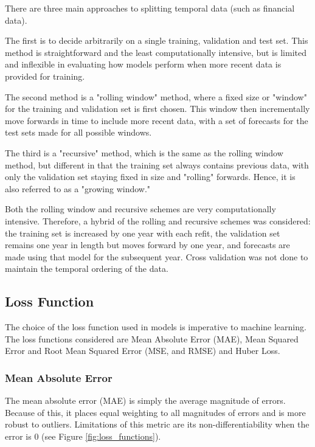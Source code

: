 \documentclass[a4paper]{article}
\begin{document}
	There are three main approaches to splitting temporal data (such as financial data). 
	
	The first is to decide arbitrarily on a single training, validation and test set. This method is straightforward and the least computationally intensive, but is limited and inflexible in evaluating how models perform when more recent data is provided for training. 
	
	The second method is a "rolling window" method, where a fixed size or "window" for the training and validation set is first chosen. This window then incrementally move forwards in time to include more recent data, with a set of forecasts for the test sets made for all possible windows.
	
	The third is a "recursive" method, which is the same as the rolling window method, but different in that the training set always contains previous data, with only the validation set staying fixed in size and "rolling" forwards. Hence, it is also referred to as a "growing window."
	
	Both the rolling window and recursive schemes are very computationally intensive. Therefore, a hybrid of the rolling and recursive schemes was considered: the training set is increased by one year with each refit, the validation set remains one year in length but moves forward by one year, and forecasts are made using that model for the subsequent year. Cross validation was not done to maintain the temporal ordering of the data.
	
	\subsection{Loss Function}
	
	The choice of the loss function used in models is imperative to machine learning. The loss functions considered are Mean Absolute Error (MAE), Mean Squared Error and Root Mean Squared Error (MSE, and RMSE) and Huber Loss.
	
	\subsubsection{Mean Absolute Error}
	
	The mean absolute error (MAE) is simply the average magnitude of errors. Because of this, it places equal weighting to all magnitudes of errors and is more robust to outliers. Limitations of this metric are its non-differentiability when the error is 0 (see Figure \ref{fig:loss_functions}).
	
\end{document}
